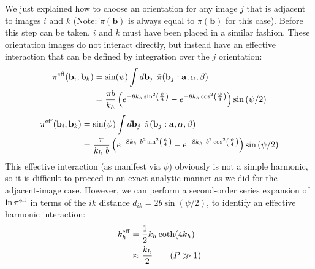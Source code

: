         We just explained how to choose an orientation for any image $j$ that is adjacent to images $i$ and $k$ (Note: $\tilde \pi ({\mathbf b})$ is always equal to $\pi ({\mathbf b})$ for this case). Before this step can be taken, $i$ and $k$ must have been placed in a similar fashion. These orientation images do not interact directly, but instead have an effective interaction that can be defined by integration over the $j$ orientation:
        \ifkhExplicitP
            \begin{equation}
            \label{eq:piEff}
                \begin{aligned}
                    \pi^{\rm eff}({\mathbf b}_i,{\mathbf b}_k)&= \sin(\psi)\int d{\mathbf b}_j \: \: \tilde \pi({\mathbf b}_j: \mathbf{a}, \alpha, \beta) \nonumber \\
                    &=\frac{\pi b}{k_h}\left( e^{ - 8 k_h \sin^2 \left( \frac{\psi}{4}\right)} - e^{ - 8 k_h \cos^2 \left( \frac{\psi}{4} \right)} \right) \sin \left(\psi /2 \right)
                \end{aligned}
            \end{equation}
        \else
            \begin{equation}
            \label{eq:piEff}
                \begin{aligned}
                    \pi^{\rm eff}({\mathbf b}_i,{\mathbf b}_k)&= \sin(\psi)\int d{\mathbf b}_j \: \: \tilde \pi({\mathbf b}_j: \mathbf{a}, \alpha, \beta) \nonumber \\
                    &=\frac{\pi}{k_h~b}\left( e^{ - 8 k_h~b^2 \sin^2 \left( \frac{\psi}{4}\right)} - e^{ - 8 k_h~b^2 \cos^2 \left( \frac{\psi}{4} \right)} \right) \sin \left(\psi /2 \right)
                \end{aligned}
            \end{equation}
        \fi
        This effective interaction (as manifest via $\psi$) obviously is not a simple harmonic, so  it is difficult to proceed in an exact analytic manner as we did for the adjacent-image case. However, we can perform a second-order series expansion of $\ln \pi^{\rm eff}$ in terms of the $ik$ distance $d_{ik} = 2b\sin(\psi/2)$, to identify an effective harmonic interaction:
        \begin{equation}
            \begin{aligned}
                k_h^{\rm eff} &= \frac{1}{2}k_h\coth(4 k_h)\\
                &\approx \frac{k_h}{2} \qquad (P \gg 1)\nonumber
            \end{aligned}
        \end{equation}
